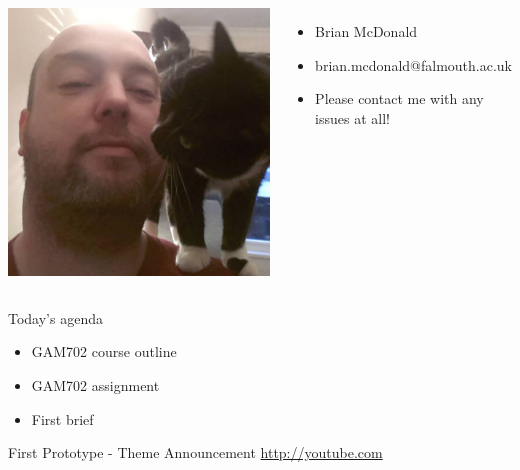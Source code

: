 \begin{frame}
	\begin{columns}
		\includegraphics[width=1.0\textwidth]{brian_mcdonald}
		\begin{itemize}
			\item Brian McDonald
			\item brian.mcdonald@falmouth.ac.uk
			\item Please contact me with any issues at all!
		\end{itemize}
	\end{columns}
\end{frame}

\begin{frame}{Today's agenda}
	\begin{itemize}
		\item GAM702 course outline
		\item GAM702 assignment
		\item First brief
	\end{itemize}
\end{frame}




\begin{frame}{First Prototype - Theme Announcement}
	\url{http://youtube.com}
\end{frame}


